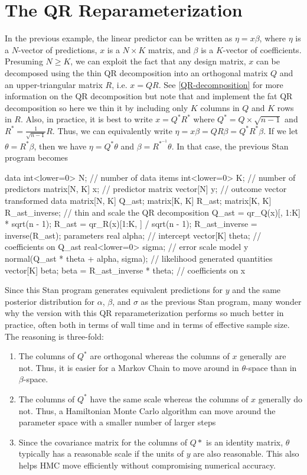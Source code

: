 \section{The QR Reparameterization}\label{QR-reparameterization.section}
In the previous example, the linear predictor can be written as
$\eta = x \beta$, where $\eta$ is a $N$-vector of predictions, 
$x$ is a $N \times K$ matrix, and $\beta$ is a $K$-vector of coefficients.
Presuming $N \geq K$, we can exploit the fact that any design matrix, $x$
can be decomposed using the thin QR decomposition into an orthogonal matrix
$Q$ and an upper-triangular matrix $R$, i.e. $x = Q R$. See \ref{QR-decomposition}
for more information on the QR decomposition but note that  and 
 implement the fat QR decomposition so here we thin it by including
only $K$ columns in $Q$ and $K$ rows in $R$. Also, in practice, it is best to
write $x = Q^\ast R^\ast$ where $Q^\ast = Q \times \sqrt{n - 1}$ and 
$R^\ast = \frac{1}{\sqrt{n - 1}} R$. Thus, we can equivalently write 
$\eta = x \beta = Q R \beta = Q^\ast R^\ast \beta$. If we let 
$\theta = R^\ast \beta$, then we have $\eta = Q^\ast \theta$ and 
$\beta = R^{\ast^{-1}} \theta$. In that case, the previous Stan program becomes
%
\begin{stancode}
data {
  int<lower=0> N;   // number of data items
  int<lower=0> K;   // number of predictors
  matrix[N, K] x;   // predictor matrix
  vector[N] y;      // outcome vector
}
transformed data {
  matrix[N, K] Q_ast;
  matrix[K, K] R_ast;
  matrix[K, K] R_ast_inverse;
  // thin and scale the QR decomposition
  Q_ast = qr_Q(x)[, 1:K] * sqrt(n - 1);
  R_ast = qr_R(x)[1:K, ] / sqrt(n - 1);
  R_ast_inverse = inverse(R_ast);
}
parameters {
  real alpha;           // intercept
  vector[K] theta;      // coefficients on Q_ast
  real<lower=0> sigma;  // error scale
}
model {
  y ~ normal(Q_ast * theta + alpha, sigma);  // likelihood
}
generated quantities {
  vector[K] beta;
  beta = R_ast_inverse * theta; // coefficients on x
}
\end{stancode}
%
Since this Stan program generates equivalent predictions for $y$ and
the same posterior distribution for $\alpha$, $\beta$, and $\sigma$
as the previous Stan program, many wonder why the version with this
QR reparameterization performs so much better in practice, often both in
terms of wall time and in terms of effective sample size. The reasoning 
is three-fold:
\begin{enumerate}
 \item The columns of $Q^\ast$ are orthogonal whereas the columns of 
   $x$ generally are not. Thus, it is easier for a Markov Chain to move
   around in $\theta$-space than in $\beta$-space.
 \item The columns of $Q^\ast$ have the same scale whereas the columns
   of $x$ generally do not. Thus, a Hamiltonian Monte Carlo algorithm
   can move around the parameter space with a smaller number of larger
   steps
 \item Since the covariance matrix for the columns of $Q\ast$ is an
   identity matrix, $\theta$ typically has a reasonable scale if the
   units of $y$ are also reasonable. This also helps HMC move efficiently
   without compromising numerical accuracy.
\end{enumerate}
